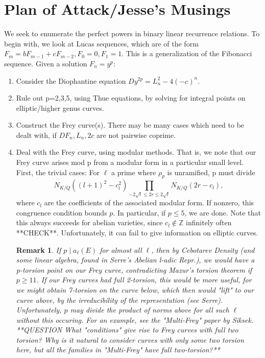 \documentclass[12pt]{article}
\newtheorem{rem}[thm]{Remark}
\def\Z{{\mathbb Z}}
\begin{document}
\section{Plan of Attack/Jesse's Musings}
We seek to enumerate the perfect powers in binary linear recurrence relations. To begin with, we look at Lucas sequences, which are of the form $F_m = b F_{m-1} + c F_{m-2}, F_0 = 0, F_1 = 1$. This is a generalization of the Fibonacci sequence. Given a solution $F_n=y^p$:
\begin{enumerate}
\item
  Consider the Diophantine equation $Dy^{2p} = L_n^2 - 4(-c)^n$.
\item
  Rule out p=2,3,5, using Thue equations, by solving for integral points on elliptic/higher genus curves.
\item
  Construct the Frey curve(s). There may be many cases which need to be dealt with, if $DF_n, L_n, 2c$ are not pairwise coprime.
\item Deal with the Frey curve, using modular methods. That is, we note that our Frey curve arises mod p from a modular form in a particular small level. First, the trivial cases:
    For $\ell$ a prime where $\rho_p$ is unramified, p must divide 
        \[ N_{K/Q}((l+1)^2 - c_l^2)\prod_{-2\sqrt{l} \leq 2r \leq 2\sqrt{l}} N_{K/Q}(2r - c_l), \]
        where $c_l$ are the coefficients of the associated modular form.
    If nonzero, this congruence condition bounds $p$. In particular, if $p \leq 5$, we are done. Note that this always succeeds for abelian varieties, since $c_l \notin \Z$ infinitely often **CHECK**. Unfortunately, it can fail to give information on elliptic curves.
    \begin{rem}
     If $p \mid a_{\ell}(E)$ for almost all $\ell$, then by Cebotarev Density (and some linear algebra, found in Serre's Abelian l-adic Repr.), we would have a p-torsion point on our Frey curve, contradicting Mazur's torsion theorem if $p \geq 11$. If our Frey curves had full 2-torsion, this would be more useful, for we might obtain 7-torsion on the curve below, which then would "lift" to our curve above, by the irreducibility of the representation (see Serre). Unfortunately, $p$ may divide the product of norms above for all such $\ell$ without this occuring. For an example, see the "Multi-Frey" paper by Siksek. 
     **QUESTION What "conditions" give rise to Frey curves with full two torsion? Why is it natural to consider curves with only some two torsion here, but all the families in "Multi-Frey" have full two-torsion?**
	\end{rem}    


\end{enumerate}
\end{document}
